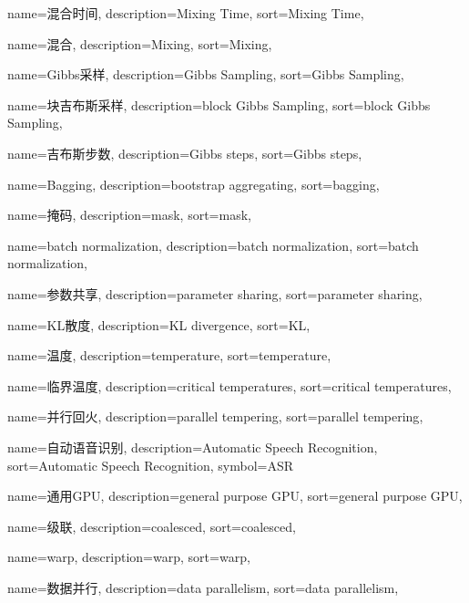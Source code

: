 {
  name=混合时间,
  description={Mixing Time},
  sort={Mixing Time},
}

{
  name=混合,
  description={Mixing},
  sort={Mixing},
}

{
  name=Gibbs采样,
  description={Gibbs Sampling},
  sort={Gibbs Sampling},
}

{
  name=块吉布斯采样,
  description={block Gibbs Sampling},
  sort={block Gibbs Sampling},
}

{
  name=吉布斯步数,
  description={Gibbs steps},
  sort={Gibbs steps},
}

{
  name=Bagging,
  description={bootstrap aggregating},
  sort={bagging},
}

{
  name=掩码,
  description={mask},
  sort={mask},
}

{
  name=batch normalization,
  description={batch normalization},
  sort={batch normalization},
}

{
  name=参数共享,
  description={parameter sharing},
  sort={parameter sharing},
}

{
  name=KL散度,
  description={KL divergence},
  sort={KL},
}

{
  name=温度,
  description={temperature},
  sort={temperature},
}

{
  name=临界温度,
  description={critical temperatures},
  sort={critical temperatures},
}

{
  name=并行回火,
  description={parallel tempering},
  sort={parallel tempering},
}

{
  name=自动语音识别,
  description={Automatic Speech Recognition},
  sort={Automatic Speech Recognition},
  symbol={ASR}
}

{
  name=通用GPU,
  description={general purpose GPU},
  sort={general purpose GPU},
}

{
  name=级联,
  description={coalesced},
  sort={coalesced},
}

{
  name=warp,
  description={warp},
  sort={warp},
}

{
  name=数据并行,
  description={data parallelism},
  sort={data parallelism},
}

